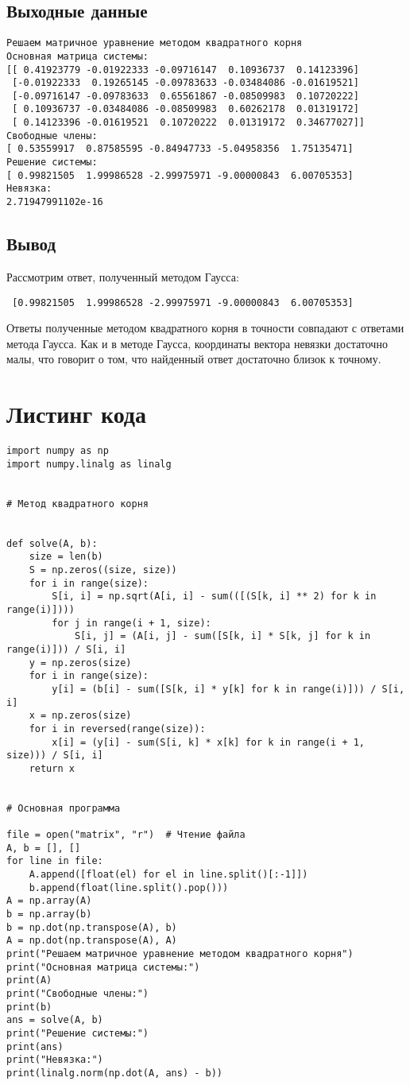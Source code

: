 \documentclass[11.4pt]{article}
\begin{document}
	\subsection{Выходные данные}
\begin{verbatim}
Решаем матричное уравнение методом квадратного корня
Основная матрица системы:
[[ 0.41923779 -0.01922333 -0.09716147  0.10936737  0.14123396]
 [-0.01922333  0.19265145 -0.09783633 -0.03484086 -0.01619521]
 [-0.09716147 -0.09783633  0.65561867 -0.08509983  0.10720222]
 [ 0.10936737 -0.03484086 -0.08509983  0.60262178  0.01319172]
 [ 0.14123396 -0.01619521  0.10720222  0.01319172  0.34677027]]
Свободные члены:
[ 0.53559917  0.87585595 -0.84947733 -5.04958356  1.75135471]
Решение системы:
[ 0.99821505  1.99986528 -2.99975971 -9.00000843  6.00705353]
Невязка:
2.71947991102e-16
 \end{verbatim}
	\subsection{Вывод}
		Рассмотрим ответ, полученный методом Гаусса:
\begin{verbatim}
 [0.99821505  1.99986528 -2.99975971 -9.00000843  6.00705353]
\end{verbatim}
Ответы полученные методом квадратного корня в точности совпадают с ответами метода Гаусса. 
Как и в методе Гаусса, координаты вектора невязки достаточно малы, что говорит о том, что найденный ответ достаточно близок к точному.
\newpage
\section{Листинг кода}
\begin{verbatim}
import numpy as np
import numpy.linalg as linalg


# Метод квадратного корня


def solve(A, b):
    size = len(b)
    S = np.zeros((size, size))
    for i in range(size):
        S[i, i] = np.sqrt(A[i, i] - sum(([(S[k, i] ** 2) for k in range(i)])))
        for j in range(i + 1, size):
            S[i, j] = (A[i, j] - sum([S[k, i] * S[k, j] for k in range(i)])) / S[i, i]
    y = np.zeros(size)
    for i in range(size):
        y[i] = (b[i] - sum([S[k, i] * y[k] for k in range(i)])) / S[i, i]
    x = np.zeros(size)
    for i in reversed(range(size)):
        x[i] = (y[i] - sum(S[i, k] * x[k] for k in range(i + 1, size))) / S[i, i]
    return x


# Основная программа

file = open("matrix", "r")  # Чтение файла
A, b = [], []
for line in file:
    A.append([float(el) for el in line.split()[:-1]])
    b.append(float(line.split().pop()))
A = np.array(A)
b = np.array(b)
b = np.dot(np.transpose(A), b)
A = np.dot(np.transpose(A), A)
print("Решаем матричное уравнение методом квадратного корня")
print("Основная матрица системы:")
print(A)
print("Свободные члены:")
print(b)
ans = solve(A, b)
print("Решение системы:")
print(ans)
print("Невязка:")
print(linalg.norm(np.dot(A, ans) - b))

\end{verbatim}
\end{document}
